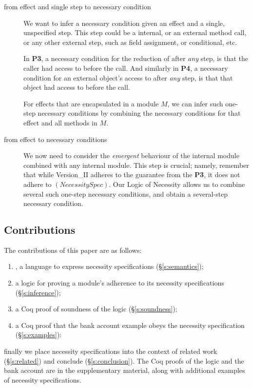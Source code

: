 \begin{description}
\item[from effect and single step to necessary condition]  We want to infer
a necessary condition given an effect and
a single, unspecified step. This step could be a internal, or an external method call,
or any other external step, such as field assignment, or conditional, etc.

In \textbf{P3},   a necessary condition for the  reduction of   after \emph{any}
step, is that the caller  had access to  before the call.
And similarly in \textbf{P4},   a necessary condition for an external object's
access to   after \emph{any}
step, is that that object had access to  before the call.

For effects that are encapsulated in a module $M$, we can infer such one-step
necessary conditions by combining the necessary conditions for that effect and 
all   methods in $M$.



\item[from effect to necessary conditions] 
We now need to consider the \emph{emergent} behaviour of the internal module
combined with any internal module. This step is crucial; namely, remember that while Version\_II adheres to
the guarantee from the \textbf{P3}, it does not adhere to  $(NecessitySpec)$.   
Our Logic of Necessity allows us to combine  several such one-step necessary conditions, and obtain a several-step necessary condition.
 
\end{description} 


\subsection{Contributions}

The contributions of this paper are as follows:
 
 \begin{enumerate}
 \item
\Chainmail, a language to
express necessity specifications (\S\ref{s:semantics});
 \item
a logic for proving a module's adherence to its
necessity specifications (\S\ref{s:inference});
\item
  a Coq proof of soundness of the logic (\S\ref{s:soundness});
\item
  a Coq proof that the bank account example obeys the necessity
  specification (\S\ref{s:examples}):
\end{enumerate}


\noindent finally we place necessity specifications into the context
of related work (\S\ref{s:related}) and conclude (\S\ref{s:conclusion}).
The Coq proofs of the logic and the bank account are in the
supplementary material, along with additional examples of necessity specifications.
